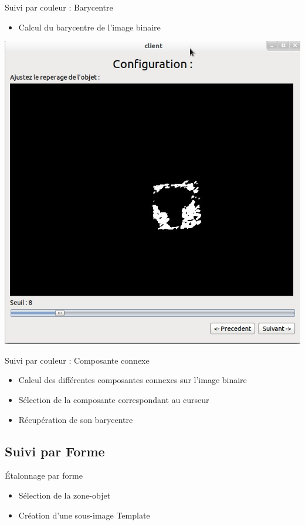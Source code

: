\documentclass{beamer}
\begin{document}
		\begin{frame}{Suivi par couleur : Barycentre}
			\begin{itemize}
				\item{Calcul du barycentre de l'image binaire}
			\end{itemize}
			\begin{center}
				\includegraphics[scale=0.25]{capture1.jpg}
			\end{center}
		\end{frame}

		\begin{frame}{Suivi par couleur : Composante connexe}
			\begin{itemize}
				\item{Calcul des différentes composantes connexes sur l'image binaire}
				\item{Sélection de la composante correspondant au curseur}
				\item{Récupération de son barycentre} 
			\end{itemize}
		\end{frame}

		\subsection{Suivi par Forme}
		\begin{frame}{Étalonnage par forme}
			\begin{itemize}
				\item{Sélection de la zone-objet}
				\item{Création d'une sous-image Template}
			\end{itemize}
		\end{frame}
\end{document}
